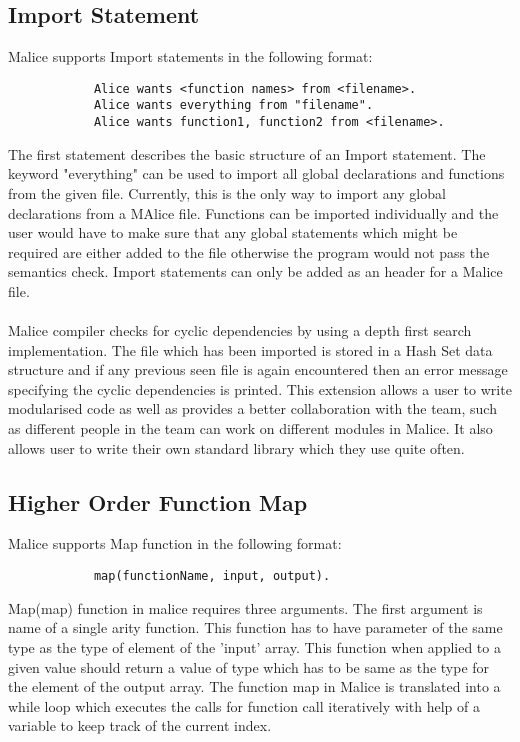 \documentclass[a4wide, 11pt]{article}
\begin{document}
	\subsection{Import Statement}
		Malice supports Import statements in the following format:
		\begin{verbatim}
		    Alice wants <function names> from <filename>.
		    Alice wants everything from "filename".
		    Alice wants function1, function2 from <filename>.
		\end{verbatim}
		The first statement describes the basic structure of an Import statement. The keyword "everything" can be used to import all global declarations and functions from the given file. Currently, this is the only way to import any global declarations from a MAlice file. Functions can be imported individually and the user would have to make sure that any global statements which might be required are either added to the file otherwise the program would not pass the semantics check. Import statements can only be added as an header for a Malice file.
		\\
		\\
		Malice compiler checks for cyclic dependencies by using a depth first search implementation. The file which has been imported is stored
		in a Hash Set data structure and if any previous seen file is again encountered then an error message specifying the cyclic dependencies
		is printed. This extension allows a user to write modularised code as well as provides a better collaboration with the team, such as
		different people in the team can work on different modules in Malice. It also allows user to write their own standard library which they
		use quite often.

	\subsection{Higher Order Function Map}
		Malice supports Map function in the following format:
		\begin{verbatim}
		    map(functionName, input, output).
		\end{verbatim}
		Map(map) function in malice requires three arguments. The first argument is name of a single arity function. This function has
		to have parameter of the same type as the type of element of the 'input' array. This function when applied to a given value should
		return a value of type which has to be same as the type for the element of the output array. The function map in Malice is translated
		into a while loop which executes the calls for function call iteratively with help of a variable to keep track of the current index.
		
\end{document}
